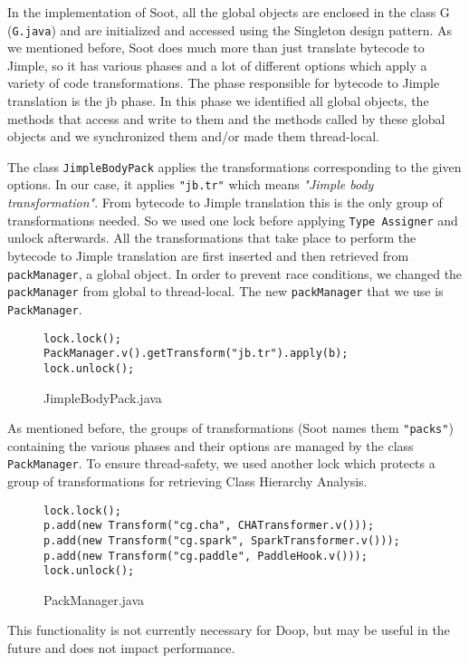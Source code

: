\documentclass{dithesis}
\begin{document}
    In the implementation of Soot, all the global objects are enclosed in the class G (\texttt{G.java}) and are initialized and accessed using the Singleton design pattern. As we mentioned before, Soot does much more than just translate bytecode to Jimple, so it has various phases and a lot of different options which apply a variety of code transformations. The phase responsible for bytecode to Jimple translation is the jb phase. In this phase we identified all global objects, the methods that access and write to them and the methods called by these global objects and we synchronized them and/or made them thread-local.

	    	The class \texttt{JimpleBodyPack} applies the transformations corresponding to the given options. In our case, it applies \texttt{"jb.tr"} which means \textit{"Jimple body transformation"}. From bytecode to Jimple translation this is the only group of transformations needed. So we used one lock before applying \texttt{Type Assigner} and unlock afterwards. All the transformations that take place to perform the bytecode to Jimple translation are first inserted and then retrieved from \texttt{packManager}, a global object. In order to prevent race conditions, we changed the \texttt{packManager} from global to thread-local. The new \texttt{packManager} that we use is \texttt{PackManager}.
	    	\begin{figure}[H]
\begin{lstlisting}
lock.lock();
PackManager.v().getTransform("jb.tr").apply(b);
lock.unlock();
\end{lstlisting}
	        \caption{JimpleBodyPack.java}
	        \end{figure}

	    	As mentioned before, the groups of transformations (Soot names them \texttt{"packs"}) containing the various phases and their options are managed by the class \texttt{PackManager}. To ensure thread-safety, we used another lock which protects a group of transformations for retrieving Class Hierarchy Analysis. 
            \begin{figure}[H]
\begin{lstlisting}
lock.lock();
p.add(new Transform("cg.cha", CHATransformer.v()));
p.add(new Transform("cg.spark", SparkTransformer.v()));
p.add(new Transform("cg.paddle", PaddleHook.v()));
lock.unlock();
\end{lstlisting}
            \caption{PackManager.java}
            \end{figure}
            This functionality is not currently necessary for Doop, but may be useful in the future and does not impact performance.
            
\end{document}
